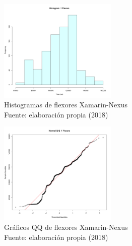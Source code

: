 \begin{figure}
 \begin{center} 
   	\includegraphics[width=0.5\textwidth]{evaluation/graphics/Xamarin/Nexus/HistFlexorsXamarinNexus.png} 
    \caption[Histogramas de flexores Xamarin-Nexus]{Histogramas de flexores  Xamarin-Nexus\\Fuente: elaboración propia (2018)} 
    \label{fig:xamarin-nexus-hist-flexors}
  \end{center}
\end{figure}

\begin{figure}[H]
  \begin{center} 
   	\includegraphics[width=0.5\textwidth]{evaluation/graphics/Xamarin/Nexus/NormalQQFlexorsXamarinNexus.png} 
    \caption[Gráfico QQ de flexores Xamarin-Nexus]{Gráficos QQ de flexores Xamarin-Nexus\\Fuente: elaboración propia (2018)} 
    \label{fig:xamarin-nexus-QQ-flexors}
  \end{center}
\end{figure}

